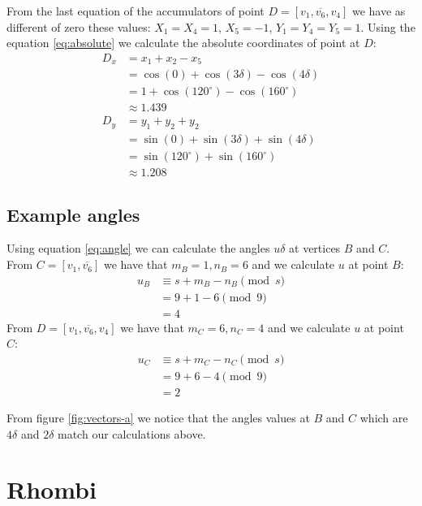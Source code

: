 \documentclass[11pt]{article}
\begin{document}
From the last equation of the accumulators of point $D = [v_1,\overline{v_6},v_4]$ we have as different of zero these values: $X_1=X_4=1$, $X_5=-1$, $Y_1=Y_4=Y_5=1$. Using the equation \ref{eq:absolute} we calculate the absolute coordinates of point at $D$:
\begin{align*}
D_x &= x_1 + x_2 - x_5\\
    &= \cos(0) + \cos(3\delta) - \cos(4\delta)\\
    &= 1 + \cos(120^\circ) - \cos(160^\circ)\\
    &\approx 1.439\\
D_y &= y_1 + y_2 + y_2\nonumber\\
    &= \sin(0) + \sin(3\delta) + \sin(4\delta)\\
    &= \sin(120^\circ) + \sin(160^\circ)\\
    &\approx 1.208
\end{align*}

\subsection{Example angles}

Using equation \ref{eq:angle} we can calculate the angles $u\delta$ at vertices $B$ and $C$. From $C=[v_1,\overline{v_6}]$ we have that $m_B=1,n_B=6$ and we calculate $u$ at point $B$:
\begin{align*}
u_B &\equiv s + m_B - n_B \pmod{s}\\
    &= 9 + 1 - 6 \pmod{9}\\
    &= 4
\end{align*}
From $D = [v_1,\overline{v_6},v_4]$ we have that $m_C=6,n_C=4$ and we calculate $u$ at point $C$:
\begin{align*}
u_C &\equiv s + m_C - n_C \pmod{s}\\
    &= 9 + 6 - 4 \pmod{9}\\
    &= 2
\end{align*}

From figure \ref{fig:vectors-a} we notice that the angles values at $B$ and $C$ which are $4\delta$ and $2\delta$ match our calculations above.

\section{Rhombi}
\end{document}

